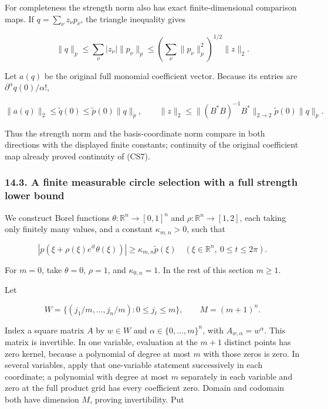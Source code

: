 \documentclass[
  11pt,
]{article}
\makeatletter
\let\ReaderOriginalAnchorStart\hyper@anchorstart
\let\ReaderOriginalAnchorEnd\hyper@anchorend
\let\ReaderPendingAliases\@empty
\def\ReaderArmAliases#1{\gdef\ReaderPendingAliases{#1}}
\def\hyper@anchorstart#1{\ReaderIfNativeAnchorTF{#1}{\ReaderPendingAliases\global\let\ReaderPendingAliases\@empty}{}\ReaderOriginalAnchorStart{#1}}
\makeatother
\begin{document}
For completeness the strength norm also has exact finite-dimensional
comparison maps. If \(q=\sum_\nu z_\nu p_\nu\), the triangle inequality
gives

\[
 \|q\|_p\leq\sum_\nu|z_\nu|\|p_\nu\|_p
       \leq\left(\sum_\nu\|p_\nu\|_p^2\right)^{1/2}\|z\|_2.
                                                                    \tag{CS8a}
\]

Let \(a(q)\) be the original full monomial coefficient vector. Because
its entries are \(\partial^\alpha q(0)/\alpha!\),

\[
 \|a(q)\|_2\leq\widetilde q(0)
                  \leq\widetilde p(0)\|q\|_p,
 \qquad
 \|z\|_2\leq\|(B^*B)^{-1}B^*\|_{2\to2}
                       \widetilde p(0)\|q\|_p.                \tag{CS8b}
\]

Thus the strength norm and the basis-coordinate norm compare in both
directions with the displayed finite constants; continuity of the
original coefficient map already proved continuity of (CS7).

\ReaderArmAliases{\ReaderOriginalAnchorStart{a-finite-measurable-circle-selection-with-a-full-strength-lower-bound}\ReaderOriginalAnchorEnd}
\subsubsection{14.3. A finite measurable circle selection with a full
strength lower
bound}\label{a-finite-measurable-circle-selection-with-a-full-strength-lower-bound}

We construct Borel functions \(\theta:\mathbb R^n\to[0,1]^n\) and
\(\rho:\mathbb R^n\to[1,2]\), each taking only finitely many values, and
a constant \(\kappa_{m,n}>0\), such that

\[
 |p(\xi+\rho(\xi)e^{it}\theta(\xi))|
       \geq\kappa_{m,n}\widetilde p(\xi)
       \quad(\xi\in\mathbb R^n,\ 0\leq t\leq2\pi).              \tag{CS9}
\]

For \(m=0\), take \(\theta=0\), \(\rho=1\), and \(\kappa_{0,n}=1\). In
the rest of this section \(m\geq1\).

Let

\[
 W=\{(j_1/m,\ldots,j_n/m):0\leq j_\ell\leq m\},\qquad M=(m+1)^n.
                                                                    \tag{CS10}
\]

Index a square matrix \(A\) by \(w\in W\) and
\(\alpha\in\{0,\ldots,m\}^n\), with \(A_{w,\alpha}=w^\alpha\). This
matrix is invertible. In one variable, evaluation at the \(m+1\)
distinct points has zero kernel, because a polynomial of degree at most
\(m\) with those zeros is zero. In several variables, apply that
one-variable statement successively in each coordinate; a polynomial
with degree at most \(m\) separately in each variable and zero at the
full product grid has every coefficient zero. Domain and codomain both
have dimension \(M\), proving invertibility. Put
\end{document}
